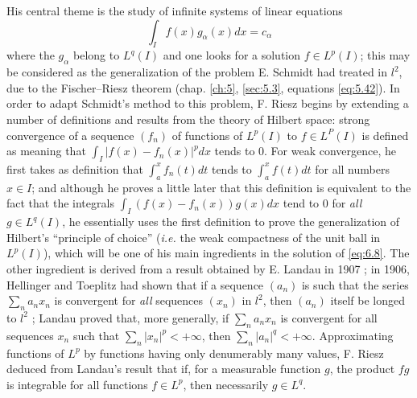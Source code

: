 \documentclass[12pt,a4paper,leqno,twoside]{extbook}
\begin{document}
His central theme is the study of infinite systems of linear equations
\begin{equation}
    \label{eq:6.8}
    \int_I f(x)g_\alpha(x)dx = c_\alpha
\end{equation}
where the \(g_\alpha\) belong to \(L^q(I)\) and one looks for a solution \(f \in L^p(I)\); this may be considered as the generalization of the problem E. Schmidt had treated in \(l^2\), due to the Fischer--Riesz theorem (chap. \ref{ch:5}, \ref{sec:5.3}, equations \eqref{eq:5.42}). In order to adapt Schmidt's method to this problem, F. Riesz begins by extending a number of definitions and results from the theory of Hilbert space: strong convergence of a sequence \((f_n)\) of functions of \(L^p(I)\) to \(f \in L^P(I)\) is defined as meaning that \( \int_I |f(x)-f_n(x)|^p dx\) tends to 0. For weak convergence, he first takes as definition that \(\int_a^x f_n(t)dt\) tends to \(\int_a^x f(t)dt\) for all numbers \(x \in I\); and although he proves a little later that this definition is equivalent to the fact that the integrals \(\int_I (f(x)-f_n(x))g(x)dx\) tend to 0 for \emph{all} \(g \in L^q(I)\), he essentially uses the first definition to prove the generalization of Hilbert's ``principle of choice'' (\emph{i.e.} the weak compactness of the unit ball in \(L^p(I)\)), which will be one of his main ingredients in the solution of \eqref{eq:6.8}. The other ingredient is derived from a result obtained by E. Landau in 1907 \cite{136}; in 1906, Hellinger and Toeplitz had shown that if a sequence \((a_n)\) is such that the series \(\sum\limits_n a_n x_n\) is convergent for \emph{all} sequences \((x_n)\) in \(l^2\), then \((a_n)\) itself be longed to \(l^2\) \cite{106}; Landau proved that, more generally, if \(\sum\limits_n a_n x_n\) is convergent for all sequences \(x_n\) such that \(\sum\limits_n |x_n|^p < +\infty\), then \(\sum\limits_n |a_n|^q < +\infty\). Approximating functions of \(L^p\) by functions having only denumerably many values, F. Riesz deduced from Landau's result that if, for a measurable function \(g\), the product \(fg\) is integrable for all functions \(f \in L^p\), then necessarily \(g \in L^q\).
\end{document}
